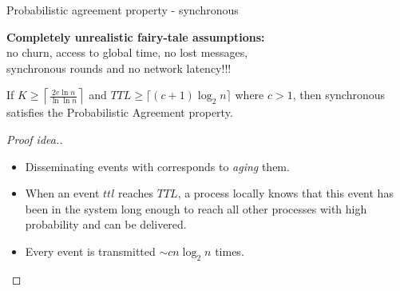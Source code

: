 \subtitle[Analysis]{Analysis}


\begin{frame}{Probabilistic agreement property - synchronous \EPTO}

  \begin{snugshade}
    \textbf{Completely unrealistic fairy-tale assumptions:} \\ no churn, access to global time, no lost messages, \\ synchronous rounds and no network latency!!!
  \end{snugshade}

\vspace{-1mm}

\begin{lemma}
\label{lem:globaltime}
If $K \geq \left\lceil\frac{2e\ln n}{\ln\ln n}\right\rceil$ and $TTL \geq \lceil (c+1) \log_2 n \rceil$ where $c>1$, then synchronous \EPTO{} satisfies the Probabilistic Agreement property.
\end{lemma}

\begin{proof}[Proof idea.]
  \begin{itemize}
  \item 
Disseminating events with \EPTO{} corresponds to \emph{aging} them. 

\item When an event $ttl$ reaches $TTL$, a process locally knows that this event has been in the system long enough to reach all other processes with high probability and can be delivered.  

\item Every event is transmitted $\sim c n \log_2 n$ times.

\end{itemize}

\end{proof}

\end{frame}


